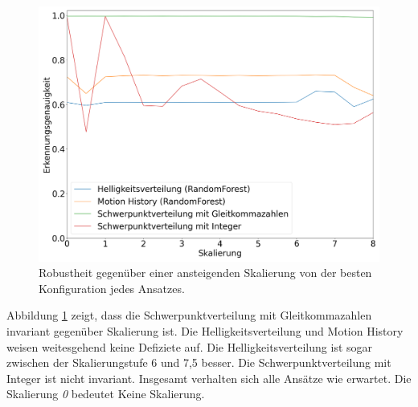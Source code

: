 \begin{figure}[h!]
    \centering
    \includegraphics[width=\linewidth]{images/brightness_scaling.png}
    \caption{Robustheit gegenüber einer ansteigenden Skalierung von der besten Konfiguration jedes Ansatzes.}
    \label{fig:brightness_scaling}
\end{figure}
\newline
\newline
Abbildung \ref{fig:brightness_scaling} zeigt, dass die Schwerpunktverteilung mit Gleitkommazahlen invariant gegenüber Skalierung ist. Die Helligkeitsverteilung und Motion History weisen weitesgehend
keine Defiziete auf. Die Helligkeitsverteilung ist sogar zwischen der Skalierungstufe 6 und 7,5 besser. Die Schwerpunktverteilung mit Integer ist nicht invariant. Insgesamt verhalten sich alle Ansätze
wie erwartet. Die Skalierung \textit{0} bedeutet \glqq Keine Skalierung\grqq.
